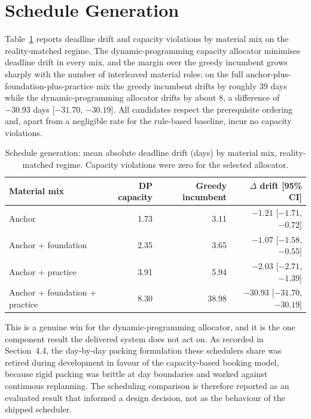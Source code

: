 \section{Schedule Generation}
Table~\ref{tab:res-sch} reports deadline drift and capacity violations by material mix on the reality-matched regime. The dynamic-programming capacity allocator minimises deadline drift in every mix, and the margin over the greedy incumbent grows sharply with the number of interleaved material roles: on the full anchor-plus-foundation-plus-practice mix the greedy incumbent drifts by roughly 39 days while the dynamic-programming allocator drifts by about 8, a difference of $-30.93$ days [$-31.70$, $-30.19$]. All candidates respect the prerequisite ordering and, apart from a negligible rate for the rule-based baseline, incur no capacity violations.

\begin{table}[htbp]
\centering
\footnotesize
\caption{Schedule generation: mean absolute deadline drift (days) by material mix, reality-matched regime. Capacity violations were zero for the selected allocator.}
\label{tab:res-sch}
\begin{tabular}{l r r r}
\toprule
\textbf{Material mix} & \textbf{DP capacity} & \textbf{Greedy incumbent} & \textbf{$\Delta$ drift [95\% CI]} \\
\midrule
Anchor & 1.73 & 3.11 & $-1.21$ [$-1.71$, $-0.72$] \\
Anchor + foundation & 2.35 & 3.65 & $-1.07$ [$-1.58$, $-0.55$] \\
Anchor + practice & 3.91 & 5.94 & $-2.03$ [$-2.71$, $-1.39$] \\
Anchor + foundation + practice & 8.30 & 38.98 & $-30.93$ [$-31.70$, $-30.19$] \\
\bottomrule
\end{tabular}
\end{table}

This is a genuine win for the dynamic-programming allocator, and it is the one component result the delivered system does not act on. As recorded in Section~4.4, the day-by-day packing formulation these schedulers share was retired during development in favour of the capacity-based booking model, because rigid packing was brittle at day boundaries and worked against continuous replanning. The scheduling comparison is therefore reported as an evaluated result that informed a design decision, not as the behaviour of the shipped scheduler.

